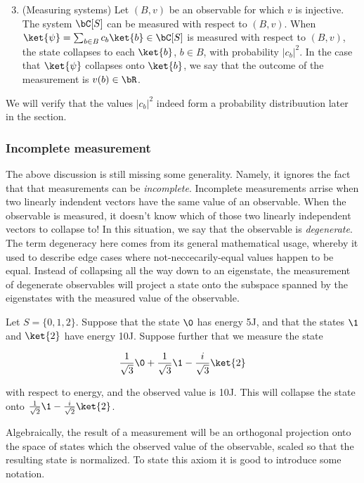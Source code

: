 \begin{enumerate}[1'.]
\setcounter{enumi}{2}

\item (Measuring systems) Let $(B,v)$ be an observable for which $v$ is injective. The system $\bC[S]$ can be measured with respect to $(B,v)$. When $\ket{\psi} = \sum_{b\in B} c_b \ket{b}\in \bC[S]$ is measured with respect to $(B,v)$, the state collapses to each $\ket{b}$, $b\in B$, with probability $|c_b|^2$. In the case that $\ket{\psi}$ collapses onto $\ket{b}$, we say that the outcome of the measurement is $v(b)\in \bR$.
\end{enumerate}


We will verify that the values $|c_b|^2$ indeed form a probability distribuution later in the section.

\subsubsection{Incomplete measurement}

The above discussion is still missing some generality. Namely, it ignores the fact that that measurements can be {\em incomplete}. Incomplete measurements arrise when two linearly indendent vectors have the same value of an observable. When the observable is measured, it doesn't know which of those two linearly independent vectors to collapse to! In this situation, we say that the observable is {\em degenerate}. The term degeneracy here comes from its general mathematical usage, whereby it used to describe edge cases where not-neccecarily-equal values happen to be equal. Instead of collapsing all the way down to an eigenstate, the measurement of degenerate observables will project a state onto the subspace spanned by the eigenstates with the measured value of the observable.

\begin{ex}
Let $S=\{0,1,2\}$. Suppose that the state $\0$ has energy 5J, and that the states $\1$ and $\ket{2}$ have energy 10J. Suppose further that we measure the state

$$\frac{1}{\sqrt{3}}\0+\frac{1}{\sqrt{3}}\1-\frac{i}{\sqrt{3}}\ket{2}$$

with respect to energy, and the observed value is 10J. This will collapse the state onto $\frac{1}{\sqrt{2}}\1-\frac{i}{\sqrt{2}}\ket{2}$.
\end{ex}

Algebraically, the result of a measurement will be an orthogonal projection onto the space of states which the observed value of the observable, scaled so that the resulting state is normalized. To state this axiom it is good to introduce some notation.

